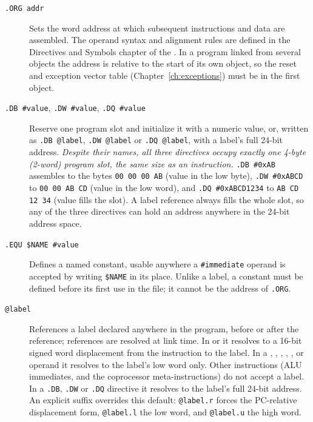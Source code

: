 \begin{description}
	\item[\texttt{.ORG addr}] Sets the word address at which subsequent instructions and data are assembled. The operand syntax
	      and alignment rules are defined in the Directives and Symbols chapter of the \asmmanual{}. In a program linked from
	      several objects the address is relative to the start of its own object, so the reset and exception vector table
	      (Chapter~\ref{ch:exceptions}) must be in the first object.
	\item[\texttt{.DB \#value}, \texttt{.DW \#value}, \texttt{.DQ \#value}] Reserve one program slot and initialize it with a
	      numeric value, or, written as \texttt{.DB @label}, \texttt{.DW @label} or \texttt{.DQ @label}, with a label's full
	      24-bit address. \emph{Despite their names, all three directives occupy exactly one 4-byte (2-word) program slot,
		      the same size as an instruction.} \texttt{.DB \#0xAB} assembles to the bytes \texttt{00 00 00 AB} (value in the
	      low byte), \texttt{.DW \#0xABCD} to \texttt{00 00 AB CD} (value in the low word), and \texttt{.DQ \#0xABCD1234} to
	      \texttt{AB CD 12 34} (value fills the slot). A label reference always fills the whole slot, so any of the three
	      directives can hold an address anywhere in the 24-bit address space.
	\item[\texttt{.EQU \$NAME \#value}] Defines a named constant, usable anywhere a \texttt{\#immediate} operand is accepted
	      by writing \texttt{\$NAME} in its place. Unlike a label, a constant must be defined before its first use in the file; it
	      cannot be the address of \texttt{.ORG}.
	\item[\texttt{@label}] References a label declared anywhere in the program, before or after the reference; references are
	      resolved at link time. In  or  it resolves to a 16-bit signed word displacement from the
	      instruction to the label. In a , , , , ,
	       or  operand it resolves to the label's low word only. Other instructions (ALU
	      immediates,  and the coprocessor meta-instructions) do not accept a label. In a
	      \texttt{.DB}, \texttt{.DW} or \texttt{.DQ} directive it resolves to the label's full 24-bit address. An explicit
	      suffix overrides this default: \texttt{@label.r} forces the PC-relative displacement form, \texttt{@label.l} the low
	      word, and \texttt{@label.u} the high word.
\end{description}

